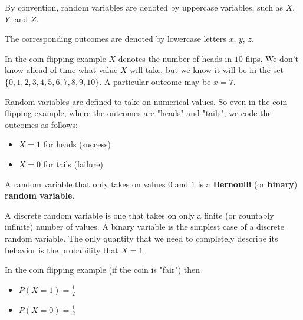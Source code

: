 \documentclass[11pt]{article}
\begin{document}
\vspace{2mm}

By convention, random variables are denoted by uppercase variables, such as $X$, $Y$, and $Z$.

\vspace{2mm}

The corresponding outcomes are denoted by lowercase letters $x$, $y$, $z$.

\vspace{2mm}

In the coin flipping example $X$ denotes the number of heads in $10$ flips. We don't know ahead of time what value $X$
will take, but we know it will be in the set $\{0, 1, 2, 3, 4, 5, 6, 7, 8, 9, 10\}$. A particular outcome may be $x = 7$.

\vspace{2mm}

Random variables are defined to take on numerical values. So even in the coin flipping example, where the outcomes are 
"heads" and "tails", we code the outcomes as follows:

\begin{itemize}
 \item $X = 1$ for heads (success)
 \item $X = 0$ for tails (failure)
\end{itemize}

\vspace{2mm}

A random variable that only takes on values $0$ and $1$ is a \textbf{Bernoulli}  (or \textbf{binary}) \textbf{random variable}.

\vspace{2mm}

A discrete random variable is one that takes on only a finite (or countably infinite) number of values. A binary variable is the
simplest case of a discrete random variable. The only quantity that we need to completely describe its behavior is the probability
that $X = 1$.

\vspace{2mm}

In the coin flipping example (if the coin is "fair") then
\begin{itemize}
 \item[] $P(X = 1) = \frac{1}{2}$
 \item[] $P(X = 0) = \frac{1}{2}$
\end{itemize}

\vspace{2mm}
\end{document}
